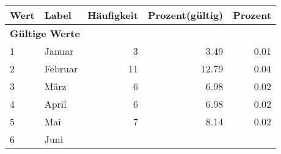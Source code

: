      \begin{longtable}{lXrrr}
     \toprule
     \textbf{Wert} & \textbf{Label} & \textbf{Häufigkeit} & \textbf{Prozent(gültig)} & \textbf{Prozent} \\
     \endhead
     \midrule
     \multicolumn{5}{l}{\textbf{Gültige Werte}}\\

     1 &
     \multicolumn{1}{X}{ Januar   } &


       \num{3} &
       \num[round-mode=places,round-precision=2]{3,49} &
         \num[round-mode=places,round-precision=2]{0,01} \\

     2 &
     \multicolumn{1}{X}{ Februar   } &


       \num{11} &
       \num[round-mode=places,round-precision=2]{12,79} &
         \num[round-mode=places,round-precision=2]{0,04} \\

     3 &
     \multicolumn{1}{X}{ März   } &


       \num{6} &
       \num[round-mode=places,round-precision=2]{6,98} &
         \num[round-mode=places,round-precision=2]{0,02} \\

     4 &
     \multicolumn{1}{X}{ April   } &


       \num{6} &
       \num[round-mode=places,round-precision=2]{6,98} &
         \num[round-mode=places,round-precision=2]{0,02} \\

     5 &
     \multicolumn{1}{X}{ Mai   } &


       \num{7} &
       \num[round-mode=places,round-precision=2]{8,14} &
         \num[round-mode=places,round-precision=2]{0,02} \\

     6 &
     \multicolumn{1}{X}{ Juni   } &



\end{longtable}
